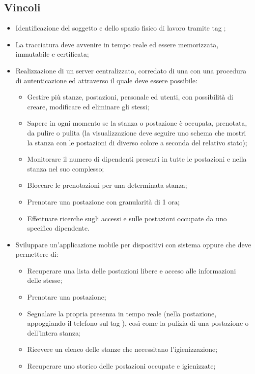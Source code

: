 \subsection{Vincoli}
\begin{itemize}
\item Identificazione del soggetto e dello spazio fisico di lavoro tramite tag ;
\item La tracciatura deve avvenire in tempo reale ed essere memorizzata, immutabile e certificata;
\item Realizzazione di un server centralizzato, corredato di una  con una procedura di autenticazione ed attraverso il quale deve essere possibile:
\begin{itemize}
\item Gestire più stanze, postazioni, personale ed utenti, con possibilità di creare, modificare ed eliminare gli stessi;
\item Sapere in ogni momento se la stanza o postazione è occupata, prenotata, da pulire o pulita (la visualizzazione deve seguire uno schema che mostri la stanza con le postazioni di diverso colore a seconda del relativo stato);
\item Monitorare il numero di dipendenti presenti in tutte le postazioni e nella stanza nel suo complesso;
\item Bloccare le prenotazioni per una determinata stanza;
\item Prenotare una postazione con granularità di 1 ora;
\item Effettuare ricerche sugli accessi e sulle postazioni occupate da uno specifico dipendente.
\end{itemize}
\item Sviluppare un'applicazione mobile per dispositivi con sistema  oppure  che deve permettere di:
\begin{itemize}
\item Recuperare una lista delle postazioni libere e acceso alle informazioni delle stesse;
\item Prenotare una postazione;
\item Segnalare la propria presenza in tempo reale (nella postazione, appoggiando il telefono sul tag ), così come la pulizia di una postazione o dell'intera stanza;
\item Ricevere  un  elenco  delle  stanze  che  necessitano l’igienizzazione;
\item Recuperare uno storico delle postazioni occupate e igienizzate;
\end{itemize}

\end{itemize}
